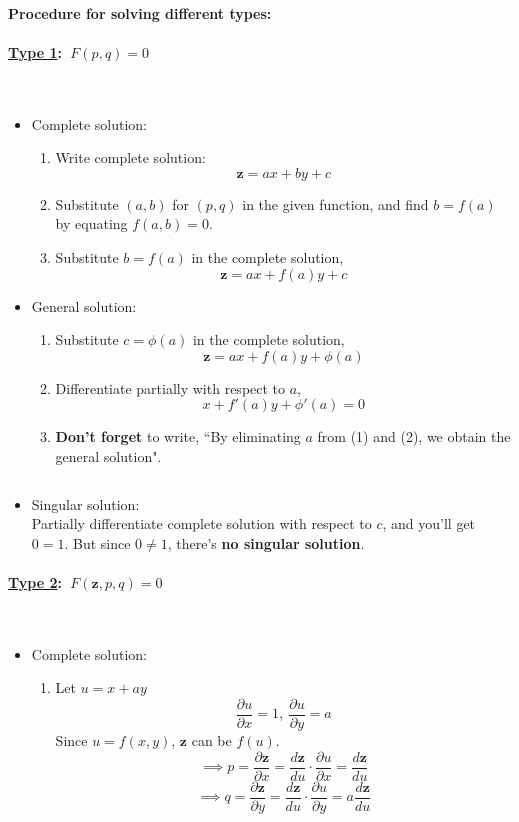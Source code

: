 \documentclass{article}
\newcommand{\para}[1]{\paragraph{#1}\mbox{}\\}
\begin{document}
{\paragraph{\LARGE Procedure for solving different types:}
\para{{\Large \underline{Type 1}: {\LARGE $\ F(p,q)=0$}}}
\begin{itemize}
\item Complete solution:
\begin{enumerate}[1)]
\item Write complete solution: {\LARGE $$\textbf{z}=ax+by+c$$}
\item Substitute $(a,b)$ for $(p,q)$ in the given function, and find {\LARGE $b=f(a)$} by equating {\LARGE $f(a,b)=0$}.
\item Substitute {\LARGE $b=f(a)$} in the complete solution,{\LARGE $$\textbf{z}=ax+f(a)y+c$$}
\end{enumerate}
\item General solution:
\begin{enumerate}[1)]
\item Substitute {\LARGE $c=\phi(a)$} in the complete solution, {\LARGE $$\textbf{z}=ax+f(a)y+\phi(a)$$}
\item Differentiate partially with respect to $a$, {\LARGE $$x+f'(a)y+\phi'(a)=0$$}
\item \textbf{Don't forget} to write, ``By eliminating {\LARGE $a$} from (1) and (2), we obtain the general solution".
\end{enumerate}
$\ $
\item Singular solution: \\
Partially differentiate complete solution with respect to {\LARGE $c$}, and you'll get {\LARGE $0=1$}. But since {\LARGE $0\neq 1$}, there's \textbf{no singular solution}.
\end{itemize}
\para{{\Large \underline{Type 2}: {\LARGE $\ F(\textbf{z},p,q)=0$}}}
\begin{itemize}
\item Complete solution:
\begin{enumerate}[1)]
\item Let {\LARGE $u=x+ay$
$$\frac{\partial u}{\partial x}=1,\  \frac{\partial u}{\partial y}=a$$}
Since {\LARGE $u=f(x,y)$}, {\LARGE $\textbf{z}$} can be {\LARGE $f(u)$}.
{\LARGE $$\implies p=\frac{\partial \textbf{z}}{\partial x}=\frac{d \textbf{z}}{d u}\cdot\frac{\partial u}{\partial x}=\frac{d \textbf{z}}{d u}$$}
{\LARGE $$\implies q=\frac{\partial \textbf{z}}{\partial y}=\frac{d \textbf{z}}{d u}\cdot\frac{\partial u}{\partial y}=a\frac{d \textbf{z}}{d u}$$}

\end{enumerate}
\end{itemize}}
\end{document}
